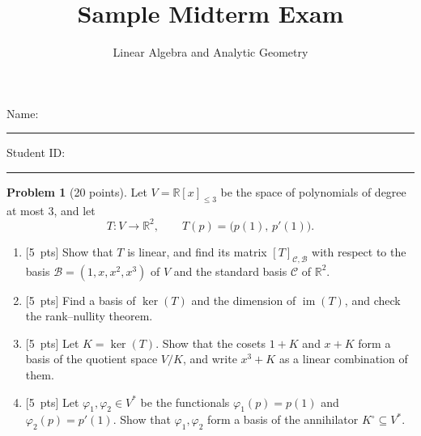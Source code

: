 \documentclass[11pt]{article}
\title{Sample Midterm Exam}
\author{Linear Algebra and Analytic Geometry}
\date{}
\theoremstyle{definition}
\newtheorem{problem}{Problem}
\newcommand{\pts}[1]{\textup{[#1~pts]}}
\DeclareMathOperator{\im}{im}
\begin{document}
\maketitle
\thispagestyle{empty}

\noindent Name: \rule{7cm}{0.4pt} \hfill Student ID: \rule{4cm}{0.4pt}

\medskip
\noindent{}

\bigskip

\begin{problem}[20 points]\label{pr:mid-linear-map}
    Let $V = \mathbb{R}[x]_{\leq 3}$ be the space of polynomials of degree at most $3$, and let
    \[T: V \to \mathbb{R}^2, \qquad T(p) = \big(p(1), \, p'(1)\big).\]
    \begin{enumerate}[label=(\alph*)]
        \item \pts{5} Show that $T$ is linear, and find its matrix $[T]_{\mathcal{C}, \mathcal{B}}$ with respect to the basis $\mathcal{B} = (1, x, x^2, x^3)$ of $V$ and the standard basis $\mathcal{C}$ of $\mathbb{R}^2$.
        \item \pts{5} Find a basis of $\ker(T)$ and the dimension of $\im(T)$, and check the rank--nullity theorem.
        \item \pts{5} Let $K = \ker(T)$. Show that the cosets $1 + K$ and $x + K$ form a basis of the quotient space $V/K$, and write $x^3 + K$ as a linear combination of them.
        \item \pts{5} Let $\varphi_1, \varphi_2 \in V^*$ be the functionals $\varphi_1(p) = p(1)$ and $\varphi_2(p) = p'(1)$. Show that $\varphi_1, \varphi_2$ form a basis of the annihilator $K^\circ \subseteq V^*$.
    \end{enumerate}
\end{problem}
\end{document}
